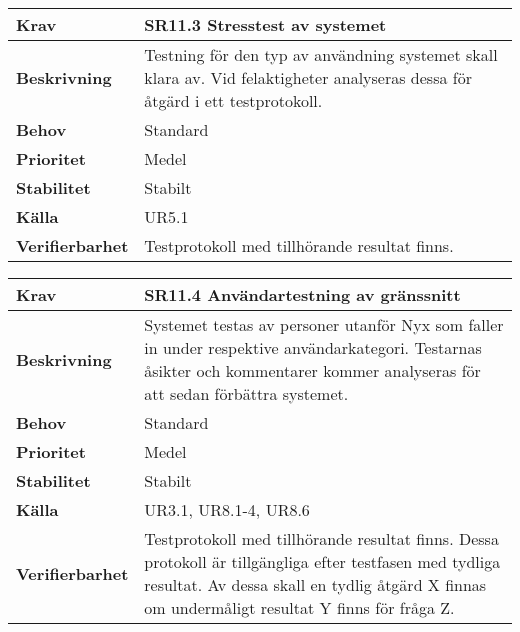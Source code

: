 \documentclass[a4paper, twoside, 11pt, titlepage]{article}
\begin{document}
	\begin {table} [ht] \begin{tabular} { p{2.6cm} p{12.5cm} }
		\hline
		\sffamily\textbf{Krav} & \sffamily\textbf{SR11.3 Stresstest av systemet } \\
		\hline
		\sffamily\textbf{Beskrivning} & Testning för den typ av användning systemet skall klara av. Vid felaktigheter analyseras dessa för åtgärd i ett testprotokoll.   \\
		\hline
		\sffamily\textbf{Behov} & Standard  \\
		\hline
		\sffamily\textbf{Prioritet} & Medel  \\
		\hline
		\sffamily\textbf{Stabilitet} & Stabilt  \\
		\hline
		\sffamily\textbf{Källa} &  UR5.1   \\
		\hline
		\sffamily\textbf{Verifierbarhet} &  Testprotokoll med tillhörande resultat finns.   \\
		\hline
	\end{tabular} \end{table} \FloatBarrier
	\vspace{6mm}

	\begin {table} [ht] \begin{tabular} { p{2.6cm} p{12.5cm} }
		\hline
		\sffamily\textbf{Krav} & \sffamily\textbf{SR11.4 Användartestning av gränssnitt  } \\
		\hline
		\sffamily\textbf{Beskrivning} & Systemet testas av personer utanför Nyx som faller in under respektive användarkategori. Testarnas åsikter och kommentarer kommer analyseras för att sedan förbättra systemet.  \\
		\hline
		\sffamily\textbf{Behov} & Standard  \\
		\hline
		\sffamily\textbf{Prioritet} & Medel  \\
		\hline
		\sffamily\textbf{Stabilitet} & Stabilt  \\
		\hline
		\sffamily\textbf{Källa} &  UR3.1, UR8.1-4, UR8.6  \\
		\hline
		\sffamily\textbf{Verifierbarhet} &  Testprotokoll med tillhörande resultat finns. Dessa protokoll är tillgängliga efter testfasen med tydliga resultat. Av dessa skall en tydlig åtgärd X finnas om undermåligt resultat Y finns för fråga Z.   \\
		\hline
	\end{tabular} \end{table} \FloatBarrier
	\vspace{6mm}
\end{document}
